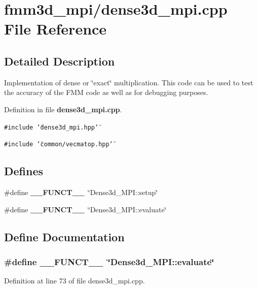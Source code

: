 \section{fmm3d\_\-mpi/dense3d\_\-mpi.cpp File Reference}
\label{dense3d__mpi_8cpp}


\subsection{Detailed Description}
Implementation of dense or \char`\"{}exact\char`\"{} multiplication. This code can be used to test the accuracy of the FMM code as well as for debugging purposes. 

Definition in file {\bf dense3d\_\-mpi.cpp}.

{\tt \#include \char`\"{}dense3d\_\-mpi.hpp\char`\"{}}\par
{\tt \#include \char`\"{}common/vecmatop.hpp\char`\"{}}\par
\subsection*{Defines}
\begin{CompactItemize}
\item 
\#define {\bf \_\-\_\-FUNCT\_\-\_\-}~\char`\"{}Dense3d\_\-MPI::setup\char`\"{}
\item 
\#define {\bf \_\-\_\-FUNCT\_\-\_\-}~\char`\"{}Dense3d\_\-MPI::evaluate\char`\"{}
\end{CompactItemize}


\subsection{Define Documentation}
\subsubsection{\setlength{\rightskip}{0pt plus 5cm}\#define \_\-\_\-FUNCT\_\-\_\-~\char`\"{}Dense3d\_\-MPI::evaluate\char`\"{}}\label{dense3d__mpi_8cpp_2818853adf63a17949cf67d73c1d4473_2818853adf63a17949cf67d73c1d4473}




Definition at line 73 of file dense3d\_\-mpi.cpp.
